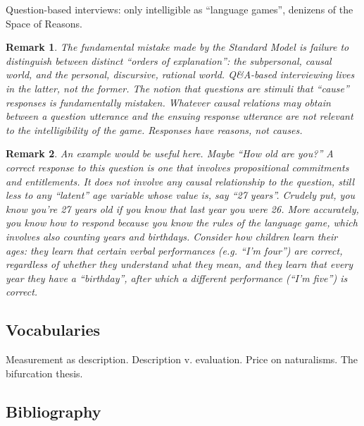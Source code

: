 \documentclass[11pt,twoside]{article}
\newtheorem{remark}{Remark}
\newcommand{\SM}{Standard Model}
\begin{document}
Question-based interviews: only intelligible as ``language games'',
denizens of the Space of Reasons.

\begin{remark}
  The fundamental mistake made by the \SM{} is failure to distinguish
  between distinct ``orders of explanation'': the subpersonal, causal
  world, and the personal, discursive, rational world.  Q\&A-based
  interviewing lives in the latter, not the former.  The notion that
  questions are stimuli that ``cause'' responses is fundamentally
  mistaken.  Whatever causal relations may obtain between a question
  utterance and the ensuing response utterance are not relevant to the
  intelligibility of the game.  Responses have \textit{reasons}, not
  causes.
\end{remark}

\begin{remark}
  An example would be useful here.  Maybe ``How old are you?''  A
  correct response to this question is one that involves propositional
  commitments and entitlements.  It does not involve any causal
  relationship to the question, still less to any ``latent'' age
  variable whose value is, say ``27 years''.  Crudely put, you know
  you're 27 years old if you know that last year you were 26.  More
  accurately, you know \textit{how} to respond because you know the
  rules of the language game, which involves also counting years and
  birthdays.  Consider how children learn their ages: they learn that
  certain verbal performances (e.g. ``I'm four'') are correct,
  regardless of whether they understand what they mean, and they learn
  that every year they have a ``birthday'', after which a different
  performance (``I'm five'') is correct.
\end{remark}

\subsection{Vocabularies}

Measurement as description.  Description v. evaluation.  Price on
naturalisms.  The bifurcation thesis.


\subsection{Bibliography}
\end{document}

